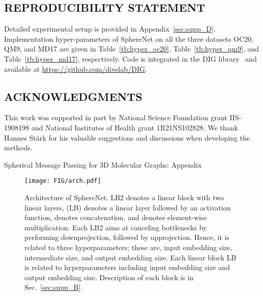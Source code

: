 \documentclass{article}
\begin{document}
\newpage
\subsection*{REPRODUCIBILITY STATEMENT}
Detailed experimental setup is provided in Appendix~\ref{sec:supp_D}. 
Implementation hyper-parameters of SphereNet
on all the three datasets OC20, QM9, and MD17 are given in Table~\ref{tb:hyper_oc20}, Table~\ref{tb:hyper_qm9},
and Table~\ref{tb:hyper_md17}, respectively.
Code is integrated in the DIG 
library~\citep{liu2021dig}
and available 
at \url{https://github.com/divelab/DIG}.

\subsection*{ACKNOWLEDGMENTS}
This work was supported in part by National Science Foundation grant IIS-1908198 and National Institutes of Health
grant 1R21NS102828. 
We thank Hannes Stärk for his valuable suggestions and discussions when developing the methods.








\clearpage
\appendix

\setcounter{page}{1}


\begin{center}

    \Large{Spherical Message Passing for 3D Molecular Graphs: Appendix}

\end{center}


\begin{figure}[th!]
    \centering
    \texttt{[image: FIG/arch.pdf]}
    \vspace{-6pt}
    \caption{Architecture of SphereNet. LB2 denotes a linear block with two linear layers, (LB) denotes a linear layer followed by an activation function,  denotes concatenation, and  denotes element-wise multiplication.
    Each LB2 aims at canceling bottlenecks by performing downprojection,
    followed by upprojection.
    Hence, it is related to three hyperparameters; these are, 
    input embedding size, intermediate size, and output embedding size.
    Each linear block LB is related to hyperparameters including input embedding size and output embedding size.
    Description of each block is in Sec.~\ref{sec:supp_B}.
    }\label{fig:arch}
    \vspace{-10 pt}
\end{figure}
\end{document}
